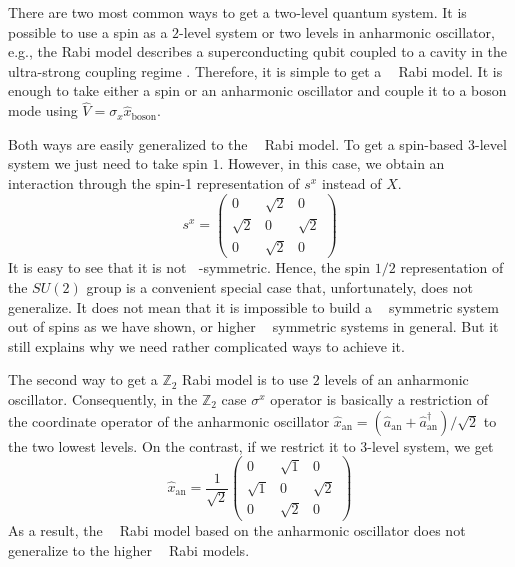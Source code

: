 \documentclass[reprint, aps, prx, amsmath, amssymb, longbibliography, superscriptaddress]{revtex4-2}
\DeclareMathOperator{\Zn}{\mathbb{Z}_n}
\DeclareMathOperator{\Zthree}{\mathbb{Z}_3}
\DeclareMathOperator{\Ztwo}{\mathbb{Z}_2}
\begin{document}
There are two most common ways to get a two-level quantum system. It is possible to use a spin as a $2$-level system  \cite{bosco_fully_2022,felicetti_quantum_2017,skogvoll_tunable_2021} or two levels in anharmonic oscillator, e.g., the Rabi model describes a superconducting qubit coupled to a cavity in the ultra-strong coupling regime \cite{niemczyk_circuit_2010,forn-diaz_ultrastrong_2017,yoshihara_superconducting_2017,vlasiuk_cavityinduced_2023, kozin_quantum_2024,chen_singlephotondriven_2017,PhysRevA.106.023702}. Therefore, it is simple to get a $\Ztwo$ Rabi model. It is enough to take either a spin or an anharmonic oscillator and couple it to a boson mode using $\hat V = \sigma_x \hat x_{\text{boson}}$.

Both ways are easily generalized to the $\Zthree$ Rabi model. To get a spin-based 3-level system we just need to take spin $1$. However, in this case, we obtain an interaction through the spin-1 representation of $s^x$ instead of $X$.
\begin{equation}
    s^x= \begin{pmatrix} 0 & \sqrt{2} & 0 \\ \sqrt{2} & 0 & \sqrt{2} \\ 0 & \sqrt{2} & 0 \end{pmatrix}
\end{equation}
It is easy to see that it is not $\Zthree$-symmetric. Hence, the spin $1/2$ representation of the $SU(2)$ group is a convenient special case that, unfortunately, does not generalize. It does not mean that it is impossible to build a $\Zthree$ symmetric system out of spins as we have shown, or higher $\Zn$ symmetric systems \cite{hutter_parafermions_2015} in general. But it still explains why we need rather complicated ways to achieve it.

The second way to get a $\mathbb{Z}_2$ Rabi model is to use $2$ levels of an anharmonic oscillator. Consequently, in the $\mathbb{Z}_2$ case $\sigma^x$ operator is basically a restriction of the coordinate operator  of the anharmonic oscillator $ \hat x_{\text{an}} = (\hat a_{\text{an}} + \hat a_{\text{an}}^{\dagger})/\sqrt{2} $ to the two lowest levels. On the contrast, if we restrict it to 3-level system, we get
\begin{equation}
    \hat x_{\text{an}} = \frac{1}{\sqrt{2}}\begin{pmatrix} 0 & \sqrt{1} & 0 \\ \sqrt{1} & 0 & \sqrt{2} \\ 0 & \sqrt{2} & 0 \end{pmatrix}
\end{equation}
As a result, the $\Ztwo$ Rabi model based on the anharmonic oscillator does not generalize to the higher $\Zn$ Rabi models.
\end{document}
